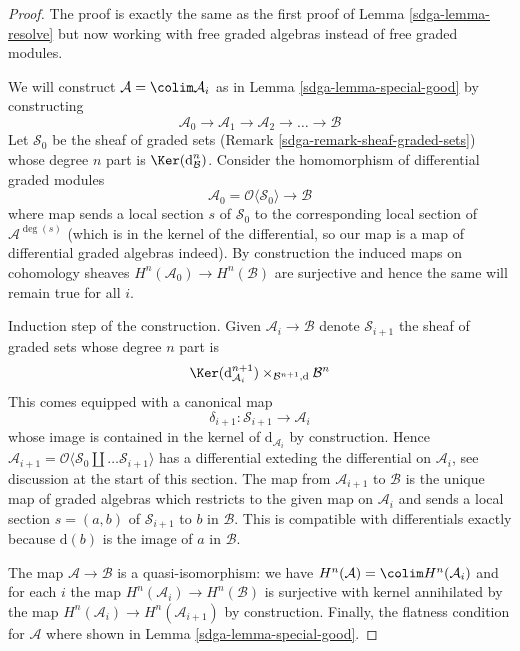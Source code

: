 \begin{proof}

The proof is exactly the same as the first proof of
Lemma \ref{sdga-lemma-resolve} but now working with free graded
algebras instead of free graded modules.

\medskip\noindent
We will construct $\mathcal{A} = \colim \mathcal{A}_i$ as in
Lemma \ref{sdga-lemma-special-good} by constructing
$$
\mathcal{A}_0 \to \mathcal{A}_1 \to \mathcal{A}_2 \to \ldots \to \mathcal{B}
$$
Let $\mathcal{S}_0$ be the sheaf of graded sets
(Remark \ref{sdga-remark-sheaf-graded-sets})
whose degree $n$ part is $\Ker(\text{d}_\mathcal{B}^n)$.
Consider the homomorphism of differential
graded modules
$$
\mathcal{A}_0 = \mathcal{O}\langle \mathcal{S}_0 \rangle
\longrightarrow
\mathcal{B}
$$
where map sends a local section $s$ of $\mathcal{S}_0$
to the corresponding local section of $\mathcal{A}^{\deg(s)}$
(which is in the kernel of the differential, so our map is
a map of differential graded algebras indeed). By construction the
induced maps on cohomology sheaves $H^n(\mathcal{A}_0) \to H^n(\mathcal{B})$
are surjective and hence the same will remain true for all $i$.

\medskip\noindent
Induction step of the construction. Given $\mathcal{A}_i \to \mathcal{B}$
denote $\mathcal{S}_{i + 1}$ the sheaf of graded sets whose degree $n$ part is
$$
\Ker(\text{d}_{\mathcal{A}_i}^{n + 1})
\times_{\mathcal{B}^{n + 1}, \text{d}}
\mathcal{B}^n
$$
This comes equipped with a canonical map
$$
\delta_{i + 1} : \mathcal{S}_{i + 1} \longrightarrow
\mathcal{A}_i
$$
whose image is contained in the kernel of $\text{d}_{\mathcal{A}_i}$
by construction. Hence $\mathcal{A}_{i + 1} = \mathcal{O}\langle
\mathcal{S}_0 \amalg \ldots \mathcal{S}_{i + 1}\rangle$ has a differential
exteding the differential on $\mathcal{A}_i$, see discussion at the
start of this section. The map from $\mathcal{A}_{i + 1}$ to
$\mathcal{B}$ is the unique map of graded algebras which
restricts to the given map on $\mathcal{A}_i$ and sends
a local section $s = (a, b)$ of $\mathcal{S}_{i + 1}$
to $b$ in $\mathcal{B}$. This is compatible with differentials
exactly because $\text{d}(b)$ is the image of $a$ in $\mathcal{B}$.

\medskip\noindent
The map $\mathcal{A} \to \mathcal{B}$ is a quasi-isomorphism:
we have $H^n(\mathcal{A}) = \colim H^n(\mathcal{A}_i)$
and for each $i$ the map $H^n(\mathcal{A}_i) \to H^n(\mathcal{B})$
is surjective with kernel annihilated by the map
$H^n(\mathcal{A}_i) \to H^n(\mathcal{A}_{i + 1})$ by construction.
Finally, the flatness condition for $\mathcal{A}$ where shown in
Lemma \ref{sdga-lemma-special-good}.
\end{proof}

